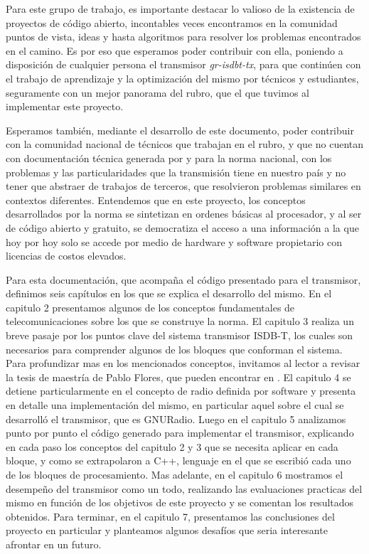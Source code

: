 Para este grupo de trabajo, es importante destacar lo valioso de la existencia de proyectos de código abierto, incontables veces encontramos en la comunidad puntos de vista, ideas y hasta algoritmos para resolver los problemas encontrados en el camino. Es por eso que esperamos poder contribuir con ella, poniendo a disposición de cualquier persona el transmisor \textit{gr-isdbt-tx}, para que continúen con el trabajo de aprendizaje y la optimización del mismo por técnicos y estudiantes, seguramente con un mejor panorama del rubro, que el que tuvimos al implementar este proyecto.

Esperamos también, mediante el desarrollo de este documento, poder contribuir con la comunidad nacional de técnicos que trabajan en el rubro, y que no cuentan con documentación técnica generada por y para la norma nacional, con los problemas y las particularidades que la transmisión tiene en nuestro país y no tener que abstraer de trabajos de terceros, que resolvieron problemas similares en contextos diferentes. Entendemos que en este proyecto, los conceptos desarrollados por la norma se sintetizan en ordenes básicas al procesador, y al ser de código abierto y gratuito, se democratiza el acceso a una información a la que hoy por hoy solo se accede por medio de hardware y software propietario con licencias de costos elevados.

Para esta documentación, que acompaña el código presentado para el transmisor, definimos seis capítulos en los que se explica el desarrollo del mismo. En el capitulo 2 presentamos algunos de los conceptos fundamentales de telecomunicaciones sobre los que se construye la norma. El capitulo 3 realiza un breve pasaje por los puntos clave del sistema transmisor ISDB-T, los cuales son necesarios para comprender algunos de los bloques que conforman el sistema. Para profundizar mas en los mencionados conceptos, invitamos al lector a revisar la tesis de maestría de Pablo Flores, que pueden encontrar en \cite{gr-isdbt}. El capitulo 4 se detiene particularmente en el concepto de radio definida por software y  presenta en detalle una implementación del mismo, en particular aquel sobre el cual se desarrolló el transmisor, que es GNURadio. Luego en el capitulo 5 analizamos punto por punto el código generado para implementar el transmisor, explicando en cada paso los conceptos del capitulo 2 y 3 que se necesita aplicar en cada bloque, y como se extrapolaron a C++, lenguaje en el que se escribió cada uno de los bloques de procesamiento. Mas adelante, en el capitulo 6 mostramos el desempeño del transmisor como un todo, realizando las evaluaciones practicas del mismo en función de los objetivos de este proyecto y se comentan los resultados obtenidos. Para terminar, en el capitulo 7, presentamos las conclusiones del proyecto en particular y planteamos algunos desafíos que seria interesante afrontar en un futuro.






